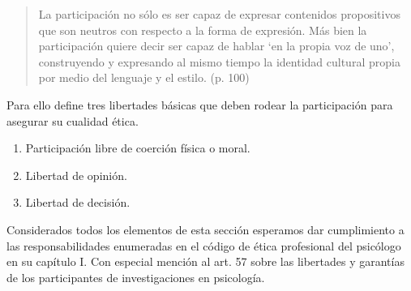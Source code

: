 \begin{quote}
    La participación no sólo es ser capaz de expresar contenidos propositivos
    que son neutros con respecto a la forma de expresión.
    Más bien la participación quiere decir ser capaz de hablar ‘en la propia voz
    de uno’, construyendo y expresando al mismo tiempo la identidad cultural
    propia por medio del lenguaje y el estilo. (p. 100)
\end{quote}

Para ello define tres libertades básicas que deben rodear la participación
para asegurar su cualidad ética.

\begin{enumerate}
    \item Participación libre de coerción física o moral.
    \item Libertad de opinión.
    \item Libertad de decisión.
\end{enumerate}

Considerados todos los elementos de esta sección esperamos dar cumplimiento a
las responsabilidades enumeradas en el código de ética profesional del
psicólogo en su capítulo I.
Con especial mención al art. 57 sobre las libertades y garantías de los
participantes de investigaciones en psicología.
